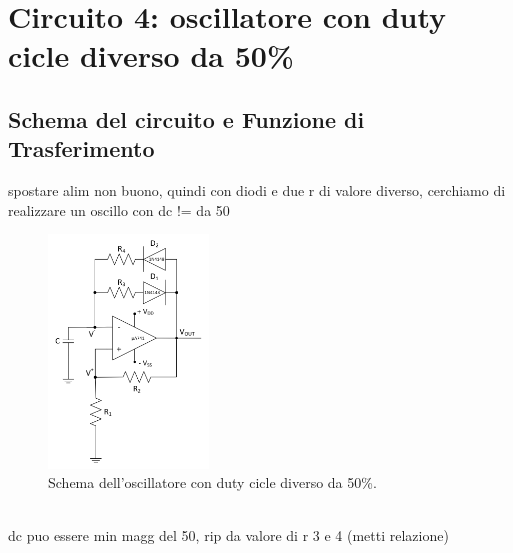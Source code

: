 \documentclass{report}
\begin{document}
\section{Circuito 4: oscillatore con duty cicle diverso da 50\%}
\subsection{Schema del circuito e Funzione di Trasferimento}
spostare alim non buono, quindi con diodi e due r di valore diverso, cerchiamo di realizzare un oscillo con dc != da 50
\begin{figure}[h]
	\centering
	\includegraphics[height=6.2cm]{immagini/schema4}
	\caption{Schema dell'oscillatore con duty cicle diverso da 50\%.}
	\label{figura:schema4}
\end{figure}
\\dc puo essere min magg del 50, rip da valore di r 3 e 4 (metti relazione)
\end{document}
